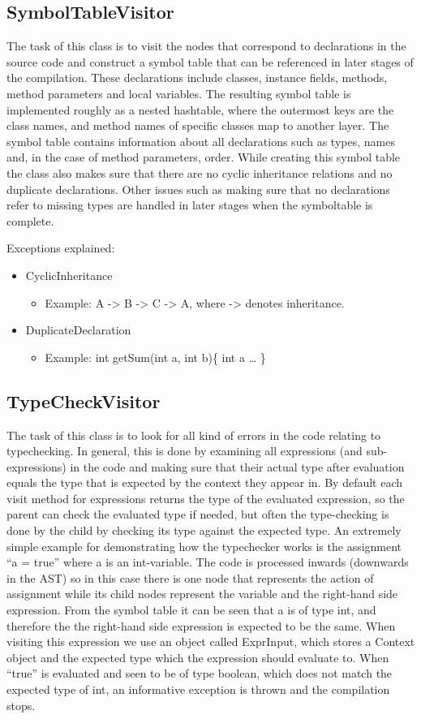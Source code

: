 \documentclass[paper=a4, fontsize=11pt]{scrartcl} %
\numberwithin{equation}{section} %
\numberwithin{figure}{section} %
\numberwithin{table}{section} %
\begin{document}
\subsection*{SymbolTableVisitor}
The task of this class is to visit the nodes that correspond to declarations in the source code and construct a symbol table that can be referenced in later stages of the compilation. These declarations include classes, instance fields, methods, method parameters and local variables. The resulting symbol table is implemented roughly as a nested hashtable, where the outermost keys are the class names, and method names of specific classes map to another layer. The symbol table contains information about all declarations such as types, names and, in the case of method parameters, order. While creating this symbol table the class also makes sure that there are no cyclic inheritance relations and no duplicate declarations. Other issues such as making sure that no declarations refer to missing types are handled in later stages when the symboltable is complete.

Exceptions explained:
\begin{itemize}
  \item{CyclicInheritance}
  \begin{itemize}
    \item{Example: A -> B -> C -> A, where -> denotes inheritance.}
  \end{itemize}
  \item{DuplicateDeclaration}
  \begin{itemize}
    \item{Example: int getSum(int a, int b)\{ int a … \}}
  \end{itemize}
\end{itemize}
\subsection*{TypeCheckVisitor}
The task of this class is to look for all kind of errors in the code relating to typechecking. In general, this is done by examining all expressions (and sub-expressions) in the code and making sure that their actual type after evaluation equals the type that is expected by the context they appear in. By default each visit method for expressions returns the type of the evaluated expression, so the parent can check the evaluated type if needed, but often the type-checking is done by the child by checking its type against the expected type. An extremely simple example for demonstrating how the typechecker works is the assignment “a = true” where a is an int-variable. The code is processed inwards (downwards in the AST) so in this case there is one node that represents the action of assignment while its child nodes represent the variable and the right-hand side expression. From the symbol table it can be seen that a is of type int, and therefore the the right-hand side expression is expected to be the same. When visiting this expression we use an object called ExprInput, which stores a Context object and the expected type which the expression should evaluate to. When “true” is evaluated and seen to be of type boolean, which does not match the expected type of int, an informative exception is thrown and the compilation stops.
\end{document}
